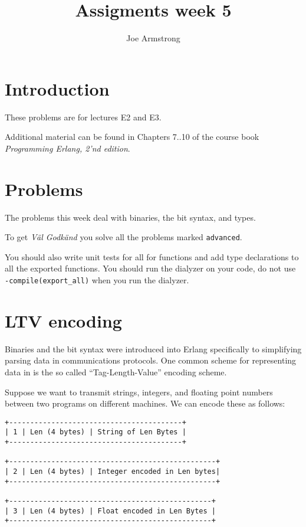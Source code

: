 \documentclass[12pt]{hitec}
\title{Assigments week 5}
\author{Joe Armstrong}
\begin{document}
\maketitle

\tableofcontents

\section{Introduction}
These problems are for lectures E2 and E3.

Additional material can be found in Chapters 7..10 of the course book
{\sl Programming Erlang, 2'nd edition}.

\section{Problems}

The problems this week deal with binaries, the bit syntax, and types.

To get {\sl V\"{a}l Godk\"{a}nd} you solve all the problems marked
\verb+advanced+.

You should also write unit tests for all for functions and add type
declarations to all the exported functions. You should run the dialyzer
on your code, do not use \verb+-compile(export_all)+ when you run the dialyzer.

\section{LTV encoding}

Binaries and the bit syntax were introduced into Erlang specifically to
simplifying parsing data in communications protocols. 
One common scheme for representing data in
is the so called ``Tag-Length-Value'' encoding scheme.

Suppose we want to transmit strings, integers, and floating point numbers
between two programs on different machines. We can encode these as follows:

\begin{verbatim}
+-----------------------------------------+
| 1 | Len (4 bytes) | String of Len Bytes |
+-----------------------------------------+

+-------------------------------------------------+
| 2 | Len (4 bytes) | Integer encoded in Len bytes|
+-------------------------------------------------+

+------------------------------------------------+
| 3 | Len (4 bytes) | Float encoded in Len Bytes |
+------------------------------------------------+
\end{verbatim}
\end{document}
